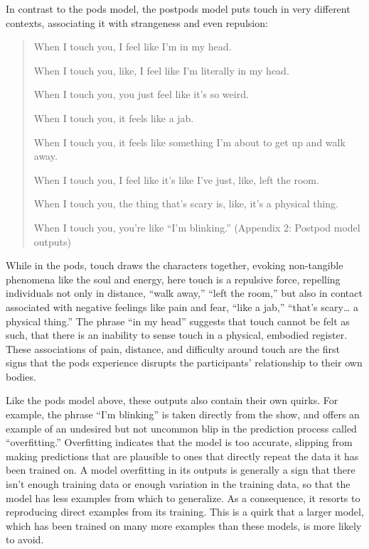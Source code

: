 \documentclass[11pt]{article}
\begin{document}
In contrast to the pods model, the postpods model puts touch in very
different contexts, associating it with strangeness and even
repulsion:

\begin{quote}
When I touch you, I feel like I’m in my head.

When I touch you, like, I feel like I’m literally in my head.

When I touch you, you just feel like it’s so weird.

When I touch you, it feels like a jab.

When I touch you, it feels like something I’m about to get up and walk
away.

When I touch you, I feel like it’s like I’ve just, like, left the
room.

When I touch you, the thing that’s scary is, like, it’s a physical
thing.

When I touch you, you’re like “I’m blinking.” (Appendix 2: Postpod model outputs) 
\end{quote}
While in the pods, touch draws the characters together, evoking
non-tangible phenomena like the soul and energy, here touch is a
repulsive force, repelling individuals not only in distance, “walk
away,” “left the room,” but also in contact associated with negative
feelings like pain and fear, “like a jab,” “that’s scary… a physical
thing.” The phrase “in my head” suggests that touch cannot be felt as
such, that there is an inability to sense touch in a physical,
embodied register. These associations of pain, distance, and
difficulty around touch are the first signs that the pods experience
disrupts the participants’ relationship to their own bodies.

Like the pods model above, these outputs also contain their own
quirks. For example, the phrase “I’m blinking” is taken directly from
the show, and offers an example of an undesired but not uncommon blip
in the prediction process called “overfitting.” Overfitting indicates
that the model is too accurate, slipping from making predictions that
are plausible to ones that directly repeat the data it has been
trained on. A model overfitting in its outputs is generally a sign
that there isn’t enough training data or enough variation in the
training data, so that the model has less examples from which to
generalize. As a consequence, it resorts to reproducing direct
examples from its training. This is a quirk that a larger model, which
has been trained on many more examples than these models, is more
likely to avoid.
\end{document}
